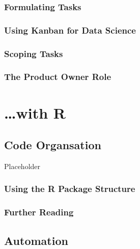 \documentclass[]{book}
\begin{document}
\hypertarget{formulating-tasks}{%
\section{Formulating Tasks}\label{formulating-tasks}}

\hypertarget{using-kanban-for-data-science}{%
\section{Using Kanban for Data Science}\label{using-kanban-for-data-science}}

\hypertarget{scoping-tasks}{%
\section{Scoping Tasks}\label{scoping-tasks}}

\hypertarget{the-product-owner-role}{%
\section{The Product Owner Role}\label{the-product-owner-role}}

\hypertarget{part-with-r}{%
\part{\ldots{}with R}\label{part-with-r}}

\hypertarget{code-organsation}{%
\chapter{Code Organsation}\label{code-organsation}}

Placeholder

\hypertarget{using-the-r-package-structure}{%
\section{Using the R Package Structure}\label{using-the-r-package-structure}}

\hypertarget{further-reading}{%
\section{Further Reading}\label{further-reading}}

\hypertarget{automation}{%
\chapter{Automation}\label{automation}}
\end{document}
